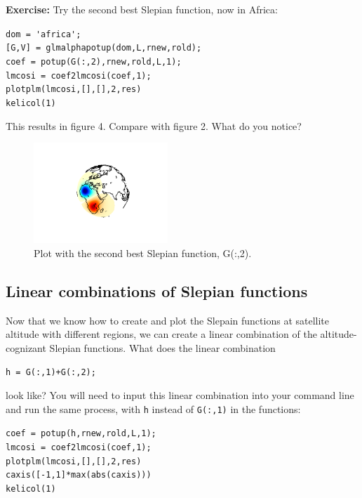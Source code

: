 \documentclass[11pt]{article}
\begin{document}
\textbf{Exercise:} Try the second best Slepian function, now in Africa:

\verb+dom = 'africa';+\\
\verb+[G,V] = glmalphapotup(dom,L,rnew,rold);+\\
\verb+coef = potup(G(:,2),rnew,rold,L,1);+\\
\verb+lmcosi = coef2lmcosi(coef,1);+\\
\verb+plotplm(lmcosi,[],[],2,res)+\\
\verb+kelicol(1)+

This results in figure 4.  Compare with figure 2.  What do you notice?

\begin{figure}[H]
  \centering
  \includegraphics[width=0.45\textwidth]{figures/G(:,2)ml.png}
  \caption{Plot with the second best Slepian function, G(:,2).}
\label{G(:,2)}
\end{figure}

\subsection{Linear combinations of Slepian functions}

Now that we know how to create and plot the Slepain functions at satellite altitude with different regions, we can create a linear combination of the altitude-cognizant Slepian functions.  What does the linear combination 

\verb|h = G(:,1)+G(:,2);| 

look like?  You will need to input this linear combination into your command line and run the same process, with \verb+h+ instead of \verb+G(:,1)+ in the functions:

\verb+coef = potup(h,rnew,rold,L,1);+\\
\verb+lmcosi = coef2lmcosi(coef,1);+\\
\verb+plotplm(lmcosi,[],[],2,res)+\\
\verb+caxis([-1,1]*max(abs(caxis)))+\\
\verb+kelicol(1)+
\end{document}

